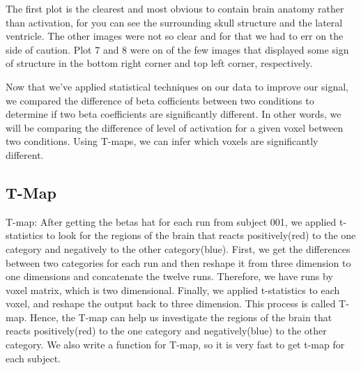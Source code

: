\documentclass[12pt]{article}
\begin{document}
The first plot is the clearest and most obvious to contain brain anatomy rather 
than activation, for you can see the surrounding skull structure and the 
lateral ventricle. The other images were not so clear and for that we had to 
err on the side of caution. Plot 7 and 8 were on of the few images that 
displayed some sign of structure in the bottom right corner and top left 
corner, respectively.

\subject{Result}

Now that we've applied statistical techniques on our data to improve our signal, we compared the difference of beta cofficients between two conditions to determine if two beta coefficients are significantly different. In other words, we will be comparing the difference of level of activation for a given voxel between two conditions. Using T-maps, we can infer which voxels are significantly different.

\subsection{T-Map}

T-map:
After getting the betas hat for each run from subject 001, we applied t-statistics to look for the regions of the brain that reacts positively(red) to the one category and negatively to the other category(blue). First, we get the differences between two categories for each run and then reshape it from three dimension to one dimensions and concatenate the twelve runs. Therefore, we have runs by voxel matrix, which is two dimensional.  Finally, we applied t-statistics to each voxel, and reshape the output back to three dimension. This process is called T-map.  Hence, the T-map can help us investigate the regions of the brain that reacts positively(red) to the one category and negatively(blue) to the other category. We also write a function for T-map, so it is very fast to get t-map for  each subject.
\end{document}
